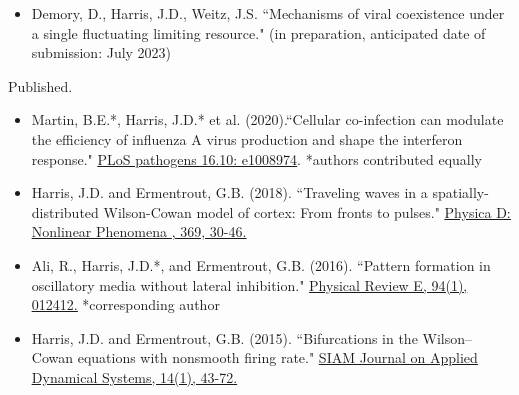 \documentclass[a4paper,10pt]{article}
\newlength{\cvcolumngapwidth}
\newlength{\cvleftcolumnwidth}
\newlength{\cvrightcolumnwidth}
\newcommand{\cvtitlestyle}[1]{{\large\cvtitlefont\textcolor{cvtitlecolor}{#1}}}
\newcommand{\cvdurationstyle}[1]{{\small\cvdurationfont\textcolor{cvdurationcolor}{#1}}}
\newlength{\cvafteritemskipamount}
\newlength{\cvaftertitleskipamount}
\newlength{\cvparskip}
\newcommand{\cvitem}[2]{
            \begin{minipage}[t]{\cvleftcolumnwidth}
                \raggedleft #1
            \end{minipage}%
            \hspace{\cvcolumngapwidth}%
            \begin{minipage}[t]{\cvrightcolumnwidth}
                \setlength{\parskip}{\cvparskip} #2
            \end{minipage}
        
            \vspace{\cvafteritemskipamount}
        }
\newcommand{\cvtitle}[1]{
            \cvtitlestyle{#1}
        
            \vspace{\cvaftertitleskipamount}
            \vspace{-\cvparskip}
        }
\begin{document}
	
        \cvitem{
            \cvdurationstyle{}
        }{	
        	\newpage
	            \begin{itemize}[leftmargin=*]

	


	\item Demory, D., Harris, J.D., Weitz, J.S. ``Mechanisms of viral coexistence under a single fluctuating limiting resource." (in preparation, anticipated date of submission: July 2023)	
			
            \end{itemize}
        }
        
        
        \cvitem{
            \cvdurationstyle{Published.}
        }{
            \begin{itemize}[leftmargin=*]
                	\item Martin, B.E.*, Harris, J.D.* et al. (2020).``Cellular co-infection can modulate the efficiency of influenza A virus production and shape the interferon response." \href{https://doi.org/10.1371/journal.ppat.1008974}{\underline{PLoS pathogens 16.10: e1008974}}. *authors contributed equally \\
	
        	        \item  Harris, J.D. and Ermentrout, G.B. (2018). ``Traveling waves in a spatially-distributed Wilson-Cowan model of cortex: From fronts to pulses." \href{https://doi.org/10.1016/j.physd.2017.12.011}{\underline{Physica D: Nonlinear Phenomena , 369, 30-46.}}
            \end{itemize}
        }    	
        \cvitem{
            \cvdurationstyle{}
        }{	
        	\newpage
        \begin{itemize}[leftmargin=*]	
                \item Ali, R., Harris, J.D.*, and Ermentrout, G.B. (2016). ``Pattern formation in oscillatory media without lateral inhibition." \href{https://doi.org/10.1103/PhysRevE.94.012412}{\underline{Physical Review E, 94(1), 012412.}}  *corresponding author \\ 
                \item Harris, J.D. and Ermentrout, G.B. (2015). ``Bifurcations in the Wilson--Cowan equations with nonsmooth firing rate." \href{https://doi.org/10.1137/140977953}{\underline{SIAM Journal on Applied Dynamical Systems, 14(1), 43-72. }}
            \end{itemize}
        
        }
        
\end{document}
